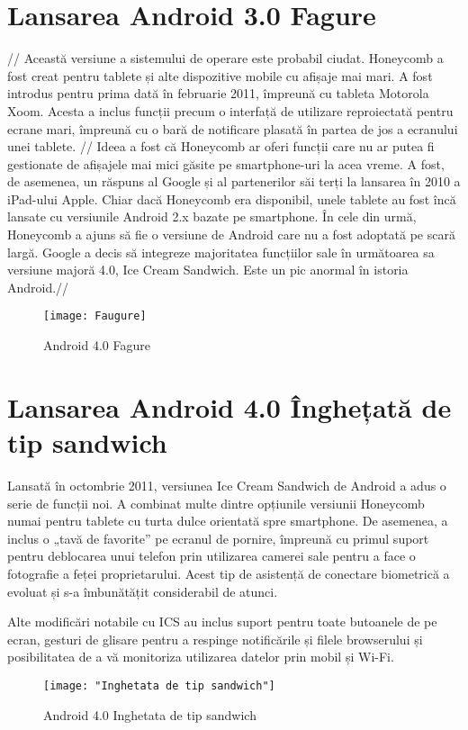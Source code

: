 \documentclass[a4paper,12pt]{amsbook}
\begin{document}
\chapter{\Large Lansarea Android 3.0 Fagure}
\par	
//
Această versiune a sistemului de operare este probabil ciudat. Honeycomb a fost creat pentru tablete și alte dispozitive mobile cu afișaje mai mari. A fost introdus pentru prima dată în februarie 2011, împreună cu tableta Motorola Xoom. Acesta a inclus funcții precum o interfață de utilizare reproiectată pentru ecrane mari, împreună cu o bară de notificare plasată în partea de jos a ecranului unei tablete.
//
Ideea a fost că Honeycomb ar oferi funcții care nu ar putea fi gestionate de afișajele mai mici găsite pe smartphone-uri la acea vreme. A fost, de asemenea, un răspuns al Google și al partenerilor săi terți la lansarea în 2010 a iPad-ului Apple. Chiar dacă Honeycomb era disponibil, unele tablete au fost încă lansate cu versiunile Android 2.x bazate pe smartphone. În cele din urmă, Honeycomb a ajuns să fie o versiune de Android care nu a fost adoptată pe scară largă. Google a decis să integreze majoritatea funcțiilor sale în următoarea sa versiune majoră 4.0, Ice Cream Sandwich. Este un pic anormal în istoria Android.//
\begin{figure}[h]
	\centering
	\texttt{[image: Faugure]}
	\caption[Fagure]{Android 4.0 Fagure}
	\label{fig:faugure}
\end{figure}

\par
\chapter{\Large Lansarea Android 4.0 Înghețată de tip sandwich}
\par
Lansată în octombrie 2011, versiunea Ice Cream Sandwich de Android a adus o serie de funcții noi. A combinat multe dintre opțiunile versiunii Honeycomb numai pentru tablete cu turta dulce orientată spre smartphone. De asemenea, a inclus o „tavă de favorite” pe ecranul de pornire, împreună cu primul suport pentru deblocarea unui telefon prin utilizarea camerei sale pentru a face o fotografie a feței proprietarului. Acest tip de asistență de conectare biometrică a evoluat și s-a îmbunătățit considerabil de atunci.

Alte modificări notabile cu ICS au inclus suport pentru toate butoanele de pe ecran, gesturi de glisare pentru a respinge notificările și filele browserului și posibilitatea de a vă monitoriza utilizarea datelor prin mobil și Wi-Fi.
\begin{figure}[h]
	\centering
	\texttt{[image: "Inghetata de tip sandwich"]}
	\caption[Inghetata de tip sandwich]{Android 4.0 Inghetata de tip sandwich}
	\label{fig:inghetata-de-tip-sandwich}
\end{figure}
\par
\end{document}
